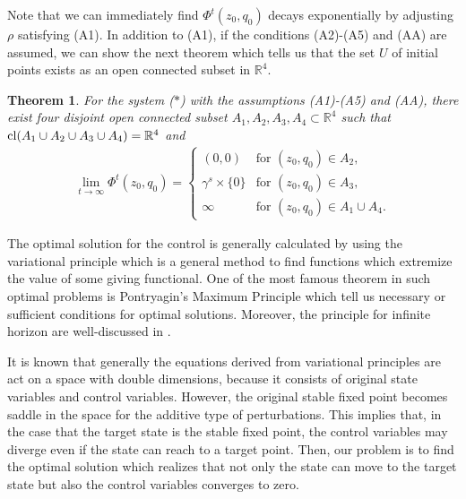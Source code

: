 \documentclass[11pt,reqno]{amsart}
\newtheorem{maintheorem}{Theorem}
\begin{document}
Note that we can immediately find $\Phi^t(z_0,q_0)$ decays exponentially by adjusting $\rho$ satisfying (A1).
In addition to (A1), if the conditions (A2)-(A5) and (AA) are assumed, we can show the next theorem which tells us that the set $U$ of initial points exists as an open connected subset in $\mathbb{R}^{4}$.

\begin{maintheorem}\label{maintheorem2}
For the system ($\ast$) with the assumptions (A1)-(A5) and (AA), there exist four disjoint open connected subset $A_1,A_2,A_3,A_4\subset\mathbb{R}^4$ such that  
${\rm cl}(A_1\cup A_2\cup A_3\cup A_4)=\mathbb{R}^4$ and
\begin{eqnarray}
\lim_{t\to\infty}\Phi^t(z_0,q_0)=
\begin{cases}
(0,0) & \text{for } (z_0,q_0)\in A_2,\\
\gamma^s\times\{0\} & \text{for } (z_0,q_0)\in A_3,\\
\infty & \text{for } (z_0,q_0)\in A_1\cup A_4.
\end{cases}\nonumber
\end{eqnarray}
\end{maintheorem}



The optimal solution for the control is generally calculated by using the variational principle which is a general method to find functions which extremize the value of some giving functional. One of the most famous theorem in such optimal problems is Pontryagin's Maximum Principle \cite{Aseev2,Tauchnitz} which tell us necessary or sufficient conditions for optimal solutions. Moreover, the principle for infinite horizon are well-discussed in \cite{Haurie, Oliveira}.  

It is known that generally the equations derived from variational principles are act on a space with double dimensions, because it consists of original state variables and control variables. However, the original stable fixed point becomes saddle in the space for the additive type of perturbations. This implies that, in the case that the target state is the stable fixed point, the control variables may diverge even if the state can reach to a target point. Then, our problem is to find the optimal solution which realizes that not only the state can move to the target state but also the control variables converges to zero. 
\end{document}
